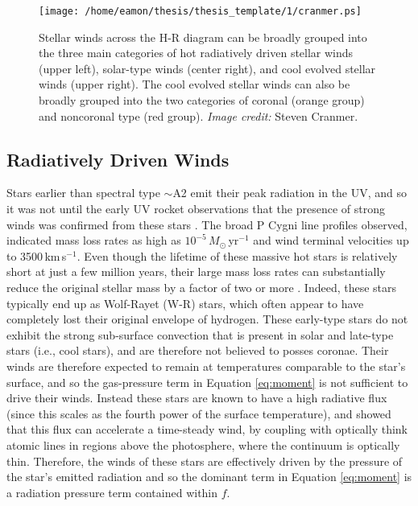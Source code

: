 \begin{figure}[hbt!]
\centering 
          \texttt{[image: /home/eamon/thesis/thesis\_template/1/cranmer.ps]}
\caption[Stellar winds across the H-R diagram.]{Stellar winds across the H-R diagram can be broadly grouped into the three main categories of hot radiatively driven stellar winds (upper left), solar-type winds (center right), and cool evolved stellar winds (upper right). The cool evolved stellar winds can also be broadly grouped into the two categories of coronal (orange group) and noncoronal type (red group). \textit{Image credit:} Steven Cranmer.}
\label{fig:1.2.3}
\end{figure}

\subsection{Radiatively Driven Winds}\label{sec:1.4.1}
Stars earlier than spectral type $\sim$A2 emit their peak radiation in the UV, and so it was not until the early UV rocket observations that the presence of strong winds was confirmed from these stars \citep[e.g.,][]{morton_1967}. The broad P Cygni line profiles observed, indicated mass loss rates as high as $10^{-5}\,M_{\odot}$\,yr$^{-1}$ and wind terminal velocities up to 3500\,km\,s$^{-1}$. Even though the lifetime of these massive hot stars is relatively short at just a few million years, their large mass loss rates can substantially reduce the original stellar mass by a factor of two or more \citep{owocki_2004}. Indeed, these stars typically end up as Wolf-Rayet (W-R) stars, which often appear to have completely lost their original envelope of hydrogen. These early-type stars do not exhibit the strong sub-surface convection that is present in solar and late-type stars (i.e., cool stars), and are therefore not believed to posses coronae. Their winds are therefore expected to remain at temperatures comparable to the star's surface, and so
the gas-pressure term in Equation \ref{eq:moment} is not sufficient to drive their winds. Instead these stars are known to have a high radiative flux (since this scales as the fourth power of the surface temperature), and \cite{castor_1975} showed that this flux can accelerate a time-steady wind, by coupling with optically think atomic lines in regions above the photosphere, where the continuum is optically thin. Therefore, the winds of these stars are effectively driven by the pressure of the star's emitted radiation and so the dominant term in Equation \ref{eq:moment} is a radiation pressure term contained within $f$.


